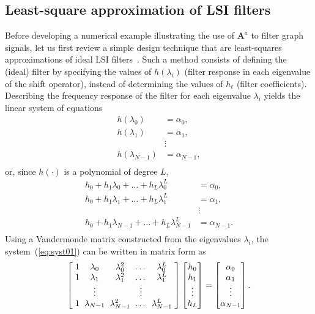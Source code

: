 \subsection{Least-square approximation of LSI filters}\label{subsec:lsi}
Before developing a numerical example illustrating the use of $\mathbf{A}^a$ to filter graph signals, let us first review a simple design technique that are least-squares approximations of ideal LSI filters~\cite{sandryhaila2014frequency}. Such a method consists of defining the (ideal) filter by specifying the values of $h(\lambda_i)$ (filter response in each eigenvalue of the shift operator), instead of determining the values of $h_{\ell}$ (filter coefficients). Describing the frequency response of the filter for each eigenvalue  $ \lambda_i $ yields the linear system of equations
\begin{equation}
\label{eq:siseq}
\begin{aligned}
h(\lambda_0) &= \alpha_0, \\
h(\lambda_1) &= \alpha_1, \\
&\vdots \\
h(\lambda_{N-1}) &= \alpha_{N-1}, \\
\end{aligned}
\end{equation}
or, since $ h(\cdot) $ is a polynomial of degree $ L $,
\begin{equation}\label{eq:syst01}
\begin{aligned}
h_0 + h_1 \lambda_0 + \dots + h_L \lambda^L_0 &= \alpha_0, \\
h_0 + h_1 \lambda_1 + \dots  + h_L \lambda^L_1 &= \alpha_1, \\
&\vdots \\
h_0 + h_1 \lambda_{N-1} + \dots + h_L \lambda^L_{N-1} &= \alpha_{N-1}. \\
\end{aligned}
\end{equation}
Using a Vandermonde matrix constructed from the eigenvalues $\lambda_i$, the system~(\ref{eq:syst01}) can be written in matrix form as
\begin{equation}\label{eq:siseq2}
\setlength{\arraycolsep}{3pt}
\left[\begin{array}{ccccc}
1 & \lambda_0 & \lambda^2_0 & \dots & \lambda^L_0 \\
1 & \lambda_1 & \lambda^2_1 & \dots & \lambda^L_1 \\
& \vdots & & \vdots & \\
1 & \lambda_{N-1} & \lambda^2_{N-1} & \dots & \lambda^L_{N-1} \\
\end{array}\right]
\begin{bmatrix}
h_0 \\
h_1 \\
\vdots \\
h_L
\end{bmatrix} =
\begin{bmatrix}
\alpha_0 \\
\alpha_1 \\
\vdots \\
\alpha_{N-1}
\end{bmatrix}.
\end{equation}
